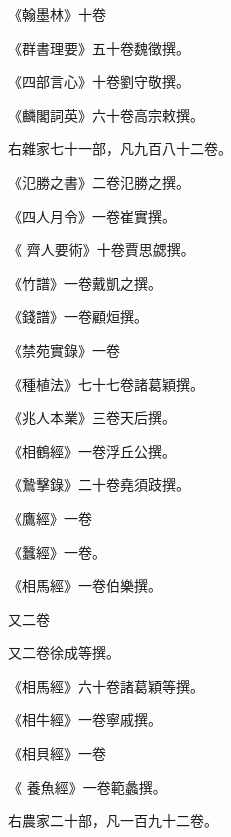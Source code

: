 \begin{pinyinscope}
 《翰墨林》十卷



 《群書理要》五十卷魏徵撰。



 《四部言心》十卷劉守敬撰。



 《麟閣詞英》六十卷高宗敕撰。



 右雜家七十一部，凡九百八十二卷。



 《氾勝之書》二卷氾勝之撰。



 《四人月令》一卷崔實撰。



 《
 齊人要術》十卷賈思勰撰。



 《竹譜》一卷戴凱之撰。



 《錢譜》一卷顧烜撰。



 《禁苑實錄》一卷



 《種植法》七十七卷諸葛穎撰。



 《兆人本業》三卷天后撰。



 《相鶴經》一卷浮丘公撰。



 《鷙擊錄》二十卷堯須跂撰。



 《鷹經》一卷



 《蠶經》一卷。



 《相馬經》一卷伯樂撰。



 又二卷



 又二卷徐成等撰。



 《相馬經》六十卷諸葛穎等撰。



 《相牛經》一卷寧戚撰。



 《相貝經》一卷



 《
 養魚經》一卷範蠡撰。



 右農家二十部，凡一百九十二卷。




\end{pinyinscope}

